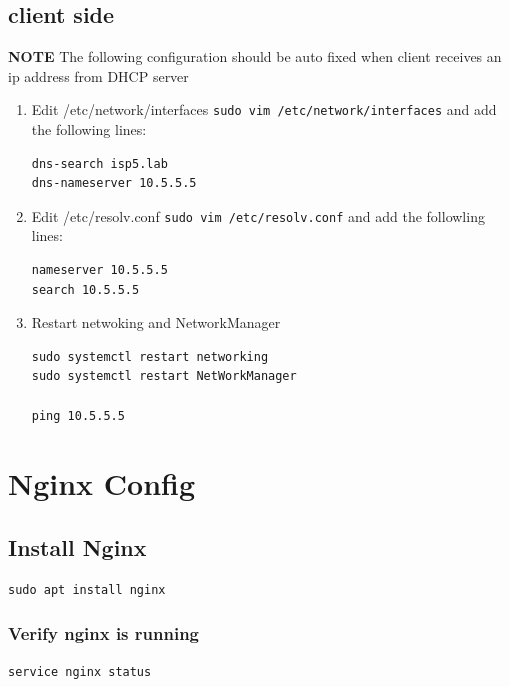 \documentclass[11pt]{article}
\begin{document}
\subsection{client side}
\label{sec:org4ee7255}

\textbf{NOTE} The following configuration should be auto fixed when client receives an ip address from DHCP server

\begin{enumerate}
\item Edit /etc/network/interfaces
\texttt{sudo vim /etc/network/interfaces} and add the following lines:

\begin{verbatim}
dns-search isp5.lab
dns-nameserver 10.5.5.5
\end{verbatim}

\item Edit /etc/resolv.conf
\texttt{sudo vim /etc/resolv.conf} and add the followling lines:

\begin{verbatim}
nameserver 10.5.5.5
search 10.5.5.5
\end{verbatim}

\item Restart netwoking and NetworkManager

\begin{verbatim}
sudo systemctl restart networking
sudo systemctl restart NetWorkManager

ping 10.5.5.5
\end{verbatim}
\end{enumerate}


\section{Nginx Config}
\label{sec:orgbecf9ed}

\subsection{Install Nginx}
\label{sec:org609a997}

\begin{verbatim}
sudo apt install nginx
\end{verbatim}

\subsubsection{Verify nginx is running}
\label{sec:orgffdbee5}
\begin{verbatim}
service nginx status
\end{verbatim}
\end{document}
